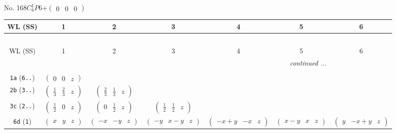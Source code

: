 \documentclass[fleqn,9pt,landscape]{jsarticle}
\begin{document}
\newpage
No. 168\quad$C_{6}^{1}$\quad$P6$\quad[ hexagonal ]\quad$+\begin{pmatrix} 0 & 0 & 0 \end{pmatrix}$
\begin{center}
\renewcommand{\arraystretch}{1.2}
\begin{longtable}{ccccccc}
 \hline \hline
WL (SS) & 1 & 2 & 3 & 4 & 5 & 6 \\ \hline \endfirsthead

\multicolumn{6}{l}{\tablename\ \thetable{}} \\
 \hline \hline
WL (SS) & 1 & 2 & 3 & 4 & 5 & 6 \\ \hline \endhead

 \hline \hline
\multicolumn{6}{r}{\footnotesize\it continued ...} \\ \endfoot

 \hline \hline
\multicolumn{6}{r}{} \\ \endlastfoot

{\tt 1a} ({\tt 6..}) & $ \begin{pmatrix} 0 & 0 & z \end{pmatrix} $ & $  $ & $  $ & $  $ & $  $ & $  $ \\ \hline
{\tt 2b} ({\tt 3..}) & $ \begin{pmatrix} \frac{1}{3} & \frac{2}{3} & z \end{pmatrix} $ & $ \begin{pmatrix} \frac{2}{3} & \frac{1}{3} & z \end{pmatrix} $ & $  $ & $  $ & $  $ & $  $ \\ \hline
{\tt 3c} ({\tt 2..}) & $ \begin{pmatrix} \frac{1}{2} & 0 & z \end{pmatrix} $ & $ \begin{pmatrix} 0 & \frac{1}{2} & z \end{pmatrix} $ & $ \begin{pmatrix} \frac{1}{2} & \frac{1}{2} & z \end{pmatrix} $ & $  $ & $  $ & $  $ \\ \hline
{\tt 6d} ({\tt 1}) & $ \begin{pmatrix} x & y & z \end{pmatrix} $ & $ \begin{pmatrix} - x & - y & z \end{pmatrix} $ & $ \begin{pmatrix} - y & x - y & z \end{pmatrix} $ & $ \begin{pmatrix} - x + y & - x & z \end{pmatrix} $ & $ \begin{pmatrix} x - y & x & z \end{pmatrix} $ & $ \begin{pmatrix} y & - x + y & z \end{pmatrix} $ \\
\end{longtable}
\end{center}
\end{document}
